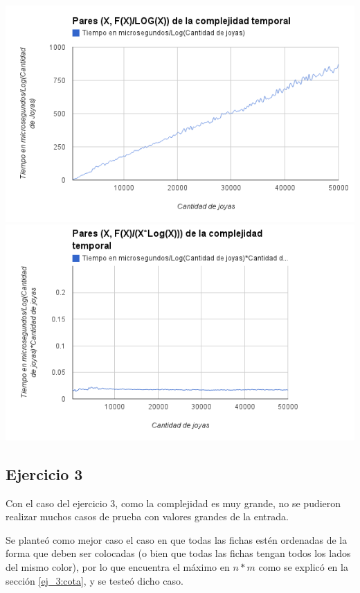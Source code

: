 \begin{center}
	\includegraphics[scale=0.60]{images/ej2_fx_logx.png}
	\includegraphics[scale=0.60]{images/ej2_fx_xlogx.png}
\end{center}

\subsection{Ejercicio 3} \label{mediciones_3}

Con el caso del ejercicio 3, como la complejidad es muy grande, no se pudieron realizar muchos casos de prueba con valores grandes de la entrada.

Se plante\'o como mejor caso el caso en que todas las fichas est\'en ordenadas de la forma que deben ser colocadas (o bien que todas las fichas tengan todos los lados del mismo color), por lo que encuentra el m\'aximo en $n*m$ como se explic\'o en la secci\'on \ref{ej_3:cota}, y se teste\'o dicho caso.

